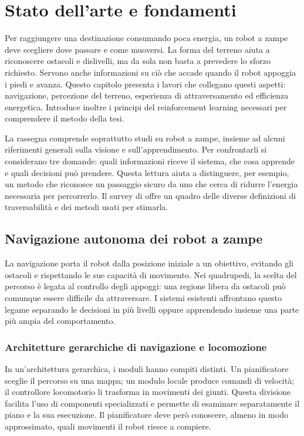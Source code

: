 \chapter{Stato dell'arte e fondamenti}
\label{chap:state-of-the-art}

Per raggiungere una destinazione consumando poca energia, un robot a zampe deve scegliere dove passare e come muoversi. La forma del terreno aiuta a riconoscere ostacoli e dislivelli, ma da sola non basta a prevedere lo sforzo richiesto. Servono anche informazioni su ciò che accade quando il robot appoggia i piedi e avanza. Questo capitolo presenta i lavori che collegano questi aspetti: navigazione, percezione del terreno, esperienza di attraversamento ed efficienza energetica. Introduce inoltre i principi del reinforcement learning necessari per comprendere il metodo della tesi.

La rassegna comprende soprattutto studi su robot a zampe, insieme ad alcuni riferimenti generali sulla visione e sull'apprendimento. Per confrontarli si considerano tre domande: quali informazioni riceve il sistema, che cosa apprende e quali decisioni può prendere. Questa lettura aiuta a distinguere, per esempio, un metodo che riconosce un passaggio sicuro da uno che cerca di ridurre l'energia necessaria per percorrerlo. Il survey di \citet{Sevastopoulos2022Survey} offre un quadro delle diverse definizioni di traversabilità e dei metodi usati per stimarla.

\section{Navigazione autonoma dei robot a zampe}
\label{sec:sota-navigazione}

La navigazione porta il robot dalla posizione iniziale a un obiettivo, evitando gli ostacoli e rispettando le sue capacità di movimento. Nei quadrupedi, la scelta del percorso è legata al controllo degli appoggi: una regione libera da ostacoli può comunque essere difficile da attraversare. I sistemi esistenti affrontano questo legame separando le decisioni in più livelli oppure apprendendo insieme una parte più ampia del comportamento.

\subsection{Architetture gerarchiche di navigazione e locomozione}

In un'architettura gerarchica, i moduli hanno compiti distinti. Un pianificatore sceglie il percorso su una mappa; un modulo locale produce comandi di velocità; il controllore locomotorio li trasforma in movimenti dei giunti. Questa divisione facilita l'uso di componenti specializzati e permette di esaminare separatamente il piano e la sua esecuzione. Il pianificatore deve però conoscere, almeno in modo approssimato, quali movimenti il robot riesce a compiere.

